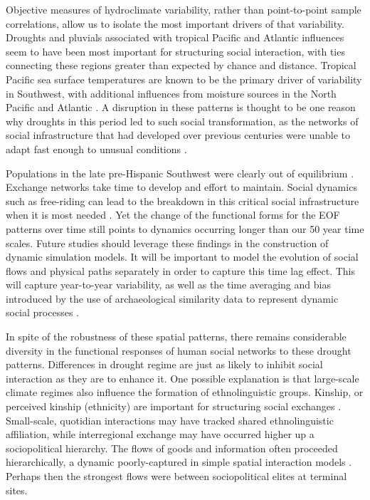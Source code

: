 \documentclass[11pt]{iopart}
\begin{document}
Objective measures of hydroclimate variability, rather than point-to-point sample correlations, allow us to isolate the most important drivers of that variability. Droughts and pluvials associated with tropical Pacific and Atlantic influences seem to have been most important for structuring social interaction, with ties connecting these regions greater than expected by chance and distance. Tropical Pacific sea surface temperatures are known to be the primary driver of variability in Southwest, with additional influences from moisture sources in the North Pacific and Atlantic \parencite{McCabe2004}. A disruption in these patterns is thought to be one reason why droughts in this period led to such social transformation, as the networks of social infrastructure that had developed over previous centuries were unable to adapt fast enough to unusual conditions \parencite{Cordell2007}. 

Populations in the late pre-Hispanic Southwest were clearly out of equilibrium \parencite{Hill2004}. Exchange networks take time to develop and effort to maintain. Social dynamics such as free-riding can lead to the breakdown in this critical social infrastructure when it is most needed \parencite{Kohler1996}. Yet the change of the functional forms for the EOF patterns over time still points to dynamics occurring longer than our 50 year time scales. Future studies should leverage these findings in the construction of dynamic simulation models. It will be important to model the evolution of social flows and physical paths separately \parencite{Bevan2013} in order to capture this time lag effect. This will capture year-to-year variability, as well as the time averaging and bias introduced by the use of archaeological similarity data to represent dynamic social processes \parencite{Crema2014}. 



In spite of the robustness of these spatial patterns, there remains considerable diversity in the functional responses of human social networks to these drought patterns. Differences in drought regime are just as likely to inhibit social interaction as they are to enhance it. One possible explanation is that large-scale climate regimes also influence the formation of ethnolinguistic groups. Kinship, or perceived kinship (ethnicity) are important for structuring social exchanges \parencite{Nolin2010}. Small-scale, quotidian interactions may have tracked shared ethnolinguistic affiliation, while interregional exchange may have occurred higher up a sociopolitical hierarchy. The flows of goods and information often proceeded hierarchically, a dynamic poorly-captured in simple spatial interaction models \parencite{Crumley1979}. Perhaps then the strongest flows were between sociopolitical elites at terminal sites.
 
\end{document}
